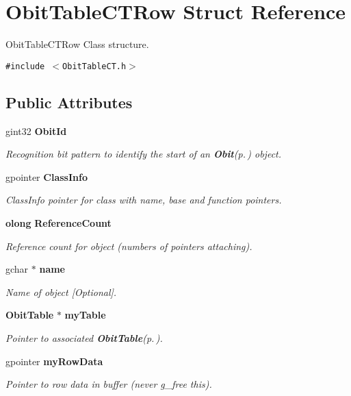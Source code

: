 \section{Obit\-Table\-CTRow Struct Reference}
\label{structObitTableCTRow}
Obit\-Table\-CTRow Class structure.  


{\tt \#include $<$Obit\-Table\-CT.h$>$}

\subsection*{Public Attributes}
\begin{CompactItemize}
\item 
gint32 {\bf Obit\-Id}
\begin{CompactList}\small\item\em Recognition bit pattern to identify the start of an {\bf Obit}{\rm (p.\,\pageref{structObit})} object. \item\end{CompactList}\item 
gpointer {\bf Class\-Info}
\begin{CompactList}\small\item\em Class\-Info pointer for class with name, base and function pointers. \item\end{CompactList}\item 
{\bf olong} {\bf Reference\-Count}
\begin{CompactList}\small\item\em Reference count for object (numbers of pointers attaching). \item\end{CompactList}\item 
gchar $\ast$ {\bf name}
\begin{CompactList}\small\item\em Name of object [Optional]. \item\end{CompactList}\item 
{\bf Obit\-Table} $\ast$ {\bf my\-Table}
\begin{CompactList}\small\item\em Pointer to associated {\bf Obit\-Table}{\rm (p.\,\pageref{structObitTable})}. \item\end{CompactList}\item 
gpointer {\bf my\-Row\-Data}
\begin{CompactList}\small\item\em Pointer to row data in buffer (never g\_\-free this). \item\end{CompactList}\item 

\end{CompactItemize}
